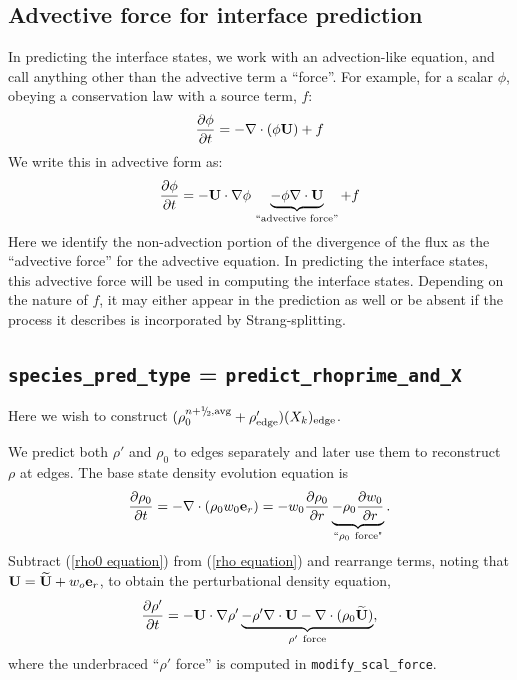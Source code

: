 \subsection{Advective force for interface prediction}
In predicting the interface states, we work with an advection-like
equation, and call anything other than the advective term a ``force''.
For example, for a scalar $\phi$, obeying a conservation law with a source term, $f$:
\begin{equation}
\frac{\partial \phi}{\partial t} = -\nabla \cdot (\phi {\bf U}) + f
\end{equation}
We write this in advective form as:
\begin{equation}
\frac{\partial \phi}{\partial t} = -{\bf U} \cdot \nabla \phi \, \underbrace{- \phi \nabla \cdot {\bf U}}_{\text{``advective force''}} + f
\end{equation}
Here we identify the non-advection portion of the divergence of the
flux as the ``advective force'' for the
advective equation.  In predicting the interface states, this advective
force will be used in computing the interface states.  Depending on the
nature of $f$, it may either appear in the prediction as well or be absent
if the process it describes is incorporated by Strang-splitting.

\subsection{{\tt species\_pred\_type} = {\tt predict\_rhoprime\_and\_X}}

Here we wish to construct $(\rho_0^{n+\myhalf,{\rm avg}}        
+ \rho'_\mathrm{edge})(X_k)_\mathrm{edge}$.

We predict both $\rho'$ and $\rho_0$ to edges separately and later use them to 
reconstruct $\rho$ at edges.  The base state density evolution equation is
\begin{equation}
\frac{\partial\rho_0}{\partial t} = -\nabla\cdot(\rho_0 w_0 {\bf e}_r) = 
-w_0\frac{\partial\rho_0}{\partial r} 
\underbrace{-\rho_0\frac{\partial w_0}{\partial r}}_{``\rho_0 ~ \text{force"}}.
\label{rho0 equation}
\end{equation}
Subtract (\ref{rho0 equation}) from (\ref{rho equation}) and rearrange
terms, noting that ${\bf U} = \widetilde{{\bf U}} + w_o{\bf e}_r$, to obtain the
perturbational density equation,
\begin{equation}
\frac{\partial\rho'}{\partial t} = -{\bf U}\cdot\nabla\rho' \underbrace{- \rho'\nabla\cdot{\bf U} 
- \nabla\cdot(\rho_0\widetilde{{\bf U}})}_{\rho' ~ \text{force}},
\label{rhoprime equation}
\end{equation}
where the underbraced ``$\rho'$ force'' is computed in {\tt modify\_scal\_force}.

